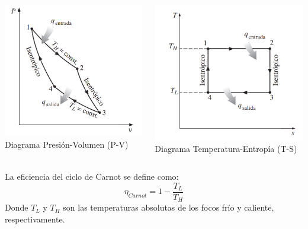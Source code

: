 \documentclass{beamer}
\begin{document}
\begin{frame}
    \begin{columns}[T]
        \begin{column}{0.5\textwidth}
            \centering
            \includegraphics[width=\textwidth]{diagrama-PV-carnot.png}
            \tiny{Diagrama Presión-Volumen (P-V)}
        \end{column}
        \begin{column}{0.5\textwidth}
            \centering
            \includegraphics[width=\textwidth]{diagrama-TS-carnot.png}
            \tiny{Diagrama Temperatura-Entropía (T-S)}
        \end{column}
    \end{columns}
    
    \vspace{0.5cm}
    La eficiencia del ciclo de Carnot se define como:
    $$ \eta_{Carnot} = 1 - \frac{T_L}{T_H} $$
    Donde $T_L$ y $T_H$ son las temperaturas absolutas de los focos frío y caliente, respectivamente.
\end{frame}
\end{document}
